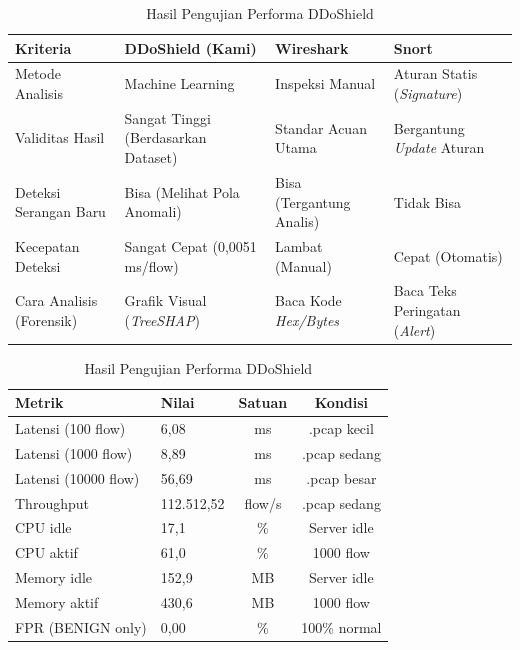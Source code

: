 \documentclass[conference,a4paper]{IEEEtran}
\begin{document}
\begin{table}[!t]
\vspace{-0.2cm}
\caption{Perbandingan Validasi DDoShield dengan Aplikasi Jaringan Umum}
\label{tab:comparison_tools}
\centering
\small
\setlength{\tabcolsep}{6pt}
\begin{tabular}{p{3.5cm}p{4cm}p{4cm}p{4cm}}
\toprule
\textbf{Kriteria} & \textbf{DDoShield (Kami)} & \textbf{Wireshark} & \textbf{Snort} \\
\midrule
Metode Analisis & Machine Learning & Inspeksi Manual & Aturan Statis (\textit{Signature}) \\
Validitas Hasil & Sangat Tinggi (Berdasarkan Dataset) & Standar Acuan Utama & Bergantung \textit{Update} Aturan \\
Deteksi Serangan Baru & Bisa (Melihat Pola Anomali) & Bisa (Tergantung Analis) & Tidak Bisa \\
Kecepatan Deteksi & Sangat Cepat (0,0051 ms/flow) & Lambat (Manual) & Cepat (Otomatis) \\
Cara Analisis (Forensik) & Grafik Visual (\textit{TreeSHAP}) & Baca Kode \textit{Hex/Bytes} & Baca Teks Peringatan (\textit{Alert}) \\
\bottomrule
\end{tabular}

\vspace{0.3cm}
\caption{Hasil Pengujian Performa DDoShield}
\label{tab:ddoshield}
\centering
\small
\begin{tabular}{llcc}
\toprule
\textbf{Metrik} & \textbf{Nilai} & \textbf{Satuan} & \textbf{Kondisi} \\
\midrule
Latensi (100 flow)   & 6,08 & ms  & .pcap kecil \\
Latensi (1000 flow)  & 8,89 & ms  & .pcap sedang \\
Latensi (10000 flow) & 56,69 & ms  & .pcap besar \\
Throughput           & 112.512,52 & flow/s & .pcap sedang \\
CPU idle             & 17,1 & \% & Server idle \\
CPU aktif            & 61,0 & \% & 1000 flow \\
Memory idle          & 152,9 & MB & Server idle \\
Memory aktif         & 430,6 & MB & 1000 flow \\
FPR (BENIGN only)    & 0,00 & \% & 100\% normal \\
\bottomrule
\end{tabular}
\end{table}
\end{document}
